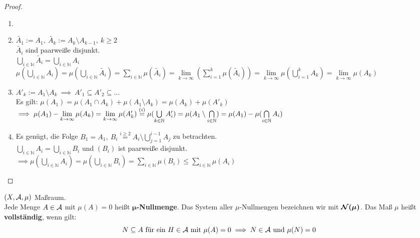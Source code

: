   \begin{proof}
    \begin{enumerate}[label=(\roman*)]
      \item[]
      \item $\tilde{A_1} := A_1, \ \tilde{A_k} := A_k \setminus A_{k-1}, \ k \geq 2$\\
            $\tilde{A_i}$ sind paarweiße disjunkt.\\
            $\bigcup\limits_{i \in \mathbb{N}} \tilde{A_i} = \bigcup\limits_{i \in \mathbb{N}} A_i$\\
            $\mu(\bigcup\limits_{i \in \mathbb{N}} A_i) = \mu(\bigcup\limits_{i \in \mathbb{N}} \tilde{A_i}) = \sum\limits_{i \in \mathbb{N}} \mu(\tilde{A_i}) = \lim\limits_{k \to \infty}(\sum\limits_{i=1}^k \mu(\tilde{A_i})) = \lim\limits_{k \to \infty} \mu(\bigcup\limits_{i=1}^k A_k) = \lim\limits_{k \to \infty} \mu(A_k)$
      \item $A'_k := A_1 \setminus A_k \ \implies \ A'_1 \subseteq A'_2 \subseteq ...$\\
            Es gilt: $\mu(A_1) = \mu(A_1 \cap A_k) + \mu(A_1 \setminus A_k) = \mu(A_k) + \mu(A'_k)$\\
            $\implies \mu(A_1) - \lim\limits_{k \to \infty} \mu(A_k) = \lim\limits_{k \to \infty} \mu(A'_k) \stackrel{(i)}{=} \mu(\bigcup\limits_{k \in \mathbb{N}} A'_i) = \mu(A_1 \setminus \bigcap\limits_{i \in \mathbb{N}})\\ = \mu(A_1) - \mu(\bigcap\limits_{i \in \mathbb{N}} A_i)$
      \item Es genügt, die Folge $B_1 = A_1,\ B_i \stackrel{i \geq 2}{=} A_i \setminus \bigcup\limits_{j=1}^{i-1}A_j$ zu betrachten.\\
            $\bigcup\limits_{i \in \mathbb{N}} A_i = \bigcup\limits_{i \in \mathbb{N}} B_i$ und $(B_i)$ ist paarweiße disjunkt.\\
            $\implies \mu(\bigcup\limits_{i \in \mathbb{N}} A_i) = \mu(\bigcup\limits_{i \in \mathbb{N}} B_i) = \sum\limits_{i \in \mathbb{N}} \mu(B_i) \leq \sum\limits_{i \in \mathbb{N}} \mu(A_i)$
    \end{enumerate}
  \end{proof}

  \begin{definition}
    $(X, \mathcal{A}, \mu)$ Maßraum.\\
    Jede Menge $A \in \mathcal{A}$ mit $\mu(A) = 0$ heißt $\bm{\mu}$\textbf{-Nullmenge}. Das System aller $\mu$-Nullmengen bezeichnen wir mit $\bm{\mathcal{N}(\mu)}$. Das Maß $\mu$ heißt \textbf{vollständig}, wenn gilt:\\
    \[
      N \subseteq A \text{ für ein } H \in \mathcal{A} \text{ mit } \mu(A)=0\\
      \implies N \in \mathcal{A} \text{ und } \mu(N)=0
    \]
  \end{definition}

